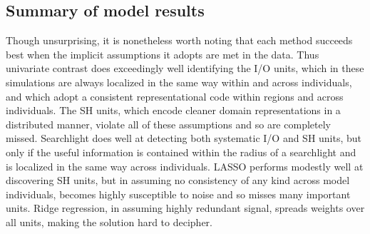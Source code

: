 \subsection{Summary of model results}
%
%
%

Though unsurprising, it is nonetheless worth noting that each method succeeds best when the implicit assumptions it adopts are met in the data. Thus univariate contrast does exceedingly well identifying the I/O units, which in these simulations are always localized in the same way within and across individuals, and which adopt a consistent representational code within regions and across individuals. The SH units, which encode cleaner domain representations in a distributed manner, violate all of these assumptions and so are completely missed. Searchlight does well at detecting both systematic I/O and SH units, but only if the useful information is contained within the radius of a searchlight and is localized in the same way across individuals. LASSO performs modestly well at discovering SH units, but in assuming no consistency of any kind across model individuals, becomes highly susceptible to noise and so misses many important units. Ridge regression, in assuming highly redundant signal, spreads weights over all units, making the solution hard to decipher.

